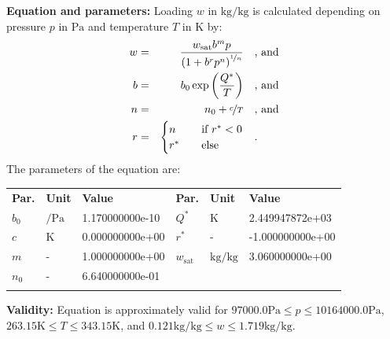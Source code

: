 \textbf{Equation and parameters:}
\newline
%
Loading $w$ in $\si{\kilogram\per\kilogram}$ is calculated depending on pressure $p$ in $\si{\pascal}$ and temperature $T$ in $\si{\kelvin}$ by:
%
\begin{equation*}
\begin{split}
w &=& \frac{w_\mathrm{sat} b^{m} p}{\left( 1 + b^{r} p^{n} \right)^{\nicefrac{1}{n}}} & \quad\text{, and} \\
b &=& b_0 \exp\left( \frac{Q^{*}}{T} \right) & \quad\text{, and} \\
n &=& n_0 + \nicefrac{c}{T} & \quad\text{, and} \\
r &=& \begin{cases} n & \quad \text{if } r^{*} < 0 \\ r^{*}  & \quad \text{else} \end{cases} & \quad\text{.}
\end{split}
\end{equation*}
%
The parameters of the equation are:
%
\begin{longtable}[l]{lll|lll}
\toprule
\addlinespace
\textbf{Par.} & \textbf{Unit} & \textbf{Value} &	\textbf{Par.} & \textbf{Unit} & \textbf{Value} \\
\addlinespace
\midrule
\endhead

\bottomrule
\endfoot
\bottomrule
\endlastfoot
\addlinespace

$b_0$ & $\si{\per\pascal}$ & 1.170000000e-10 & $Q^{*}$ & $\si{\kelvin}$ & 2.449947872e+03 \\
$c$ & $\si{\kelvin}$ & 0.000000000e+00 & $r^{*}$ & - & -1.000000000e+00 \\
$m$ & - & 1.000000000e+00 & $w_\mathrm{sat}$ & $\si{\kilogram\per\kilogram}$ & 3.060000000e+00 \\
$n_0$ & - & 6.640000000e-01 & & & \\

\addlinespace\end{longtable}

\textbf{Validity:}
\newline
Equation is approximately valid for $97000.0 \si{\pascal} \leq p \leq 10164000.0 \si{\pascal}$,  $263.15 \si{\kelvin} \leq T \leq 343.15 \si{\kelvin}$, and $0.121 \si{\kilogram\per\kilogram} \leq w \leq 1.719 \si{\kilogram\per\kilogram}$.
\newline


